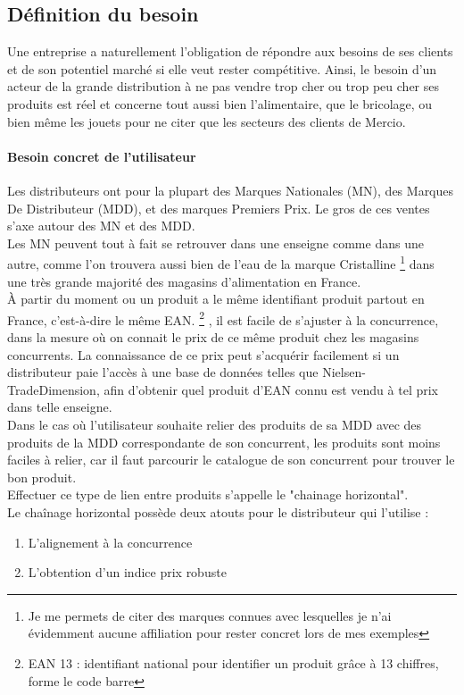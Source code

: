 \documentclass{rapportCS}
\begin{document}
\subsection{Définition du besoin}
Une entreprise a naturellement l'obligation de répondre aux besoins de ses clients et de son potentiel marché
si elle veut rester compétitive. Ainsi, le besoin d'un acteur de la grande distribution à ne pas vendre trop cher
ou trop peu cher ses produits est réel et concerne tout aussi bien l'alimentaire, que le bricolage, ou bien même 
les jouets pour ne citer que les secteurs des clients de Mercio.

\paragraph{Besoin concret de l'utilisateur}
Les distributeurs ont pour la plupart des Marques Nationales (MN), des Marques De Distributeur (MDD),
et des marques Premiers Prix.
Le gros de ces ventes s'axe autour des MN et des MDD. \\
Les MN peuvent tout à fait se retrouver dans une enseigne comme dans une autre, comme l'on
trouvera aussi bien de l'eau de la marque Cristalline 
\footnote[1]{Je me permets de citer des marques connues avec lesquelles je n'ai évidemment aucune affiliation
pour rester concret lors de mes exemples} 
dans une très grande majorité des magasins d'alimentation en France. \\
À partir du moment ou un produit a le même identifiant produit partout en France, c'est-à-dire
le même EAN.
\footnote[2]{EAN 13 : identifiant national pour identifier un produit grâce à 13 chiffres, forme le code barre}
, il est facile de s'ajuster à la concurrence, dans la mesure où on connait le prix de
ce même produit chez les magasins concurrents. 
La connaissance de ce prix peut s'acquérir facilement si un distributeur paie l'accès à une base
de données telles que Nielsen-TradeDimension, afin d'obtenir quel produit d'EAN connu est vendu à
tel prix dans telle enseigne.\\

Dans le cas où l'utilisateur souhaite relier des produits de sa MDD avec des produits de la MDD correspondante
de son concurrent, les produits sont moins faciles à relier, car il faut parcourir le catalogue de son
concurrent pour trouver le bon produit.\\

Effectuer ce type de lien entre produits s'appelle le "chainage horizontal".\\
Le chaînage horizontal possède deux atouts pour le distributeur qui l'utilise :
\begin{enumerate}
  \item L'alignement à la concurrence
  \item L'obtention d'un indice prix robuste
\end{enumerate}
\end{document}
